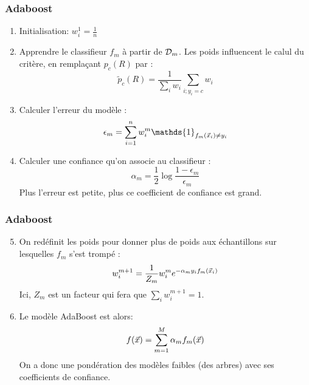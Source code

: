 \begin{frame}
  \frametitle{Adaboost}
    \begin{enumerate}
      \item Initialisation: $w_i^1 = \frac{1}{n}$
      \item Apprendre le classifieur $f_m$ à partir de $\mathcal{D}_m$. Les poids influencent le calul du critère, en remplaçant $p_c(R)$ par :
      \begin{equation}
      \tilde{p}_c(R) = \frac{1}{\sum_iw_i}\sum_{i;y_i=c}w_i
      \end{equation} 
      \item Calculer l'erreur du modèle : 
      \begin{equation*}
      \epsilon_m = \sum_{i=1}^n w_i^m \mathds{1}_{f_m(\xvec_i) \neq y_i}
      \end{equation*}
      \item Calculer une confiance qu'on associe au classifieur : 
      \begin{equation*}
      \alpha_m = \frac{1}{2}\log{\frac{1-\epsilon_m}{\epsilon_m}}
      \end{equation*}
      Plus l'erreur est petite, plus ce coefficient de confiance est grand. 
    \end{enumerate}
\end{frame}

\begin{frame}
  \frametitle{Adaboost}
    \begin{enumerate}
      \setcounter{enumi}{4}
      \item On redéfinit les poids pour donner plus de poids aux échantillons sur lesquelles $f_m$ s'est trompé : 
      \begin{equation*}
      w_i^{m+1} = \frac{1}{Z_m} w_i^{m}e^{-\alpha_m y_i f_m(\vec{x}_i)}
      \end{equation*}
      Ici, $Z_m$ est un facteur qui fera que $\sum_iw_i^{m+1}=1$. 
      \item Le modèle AdaBoost est alors: 
      \begin{equation*}
      f(\vec{x}) = \sum_{m=1}^{M}\alpha_mf_m(\vec{x})
      \end{equation*}
      On a donc une pondération des modèles faibles (des arbres) avec ses coefficients de confiance.
    \end{enumerate}
\end{frame}

